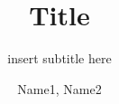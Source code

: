 \documentclass[paper=a4, 12pt]{scrreport}
\author{Name1, Name2}
\title{Title}
\subtitle{insert subtitle here}
\begin{document}
\maketitle

\begin{affidavit}
\end{affidavit}

\tableofcontents
\end{document}
